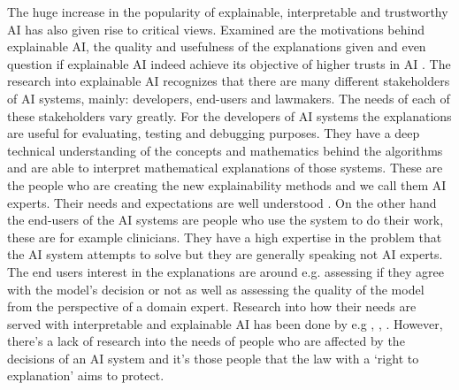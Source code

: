 \documentclass[manuscript,screen,review]{acmart}
\begin{document}
The huge increase in the popularity of explainable, interpretable and trustworthy AI has also given rise to critical views. Examined are the motivations behind explainable AI, the quality \cite{Doshi-Velez2017} and usefulness of the explanations given \cite{Miller2019} and even question if explainable AI indeed achieve its objective of higher trusts in AI \cite{Lipton2018}. The research into explainable AI recognizes that there are many different stakeholders of AI systems, mainly: developers, end-users and lawmakers. The needs of each of these stakeholders vary greatly. For the developers of AI systems the explanations are useful for evaluating, testing and debugging purposes. They have a deep technical understanding of the concepts and mathematics behind the algorithms and are able to interpret mathematical explanations of those systems. These are the people who are creating the new explainability methods and we call them AI experts. Their needs and expectations are well understood \cite{Carvalho2019}. On the other hand the end-users of the AI systems are people who use the system to do their work, these are for example clinicians. They have a high expertise in the problem that the AI system attempts to solve but they are generally speaking not AI experts. The end users interest in the explanations are around e.g. assessing if they agree with the model’s decision or not as well as assessing the quality of the model from the perspective of a domain expert. Research into how their needs are served with interpretable and explainable AI has been done by e.g \cite{Goldstein2021}, \cite{Liao2020}, \cite{Salimiparsa2021}. However, there’s a lack of research into the needs of people who are affected by the decisions of an AI system and it’s those people that the law with a ‘right to explanation’ aims to protect.
\end{document}
